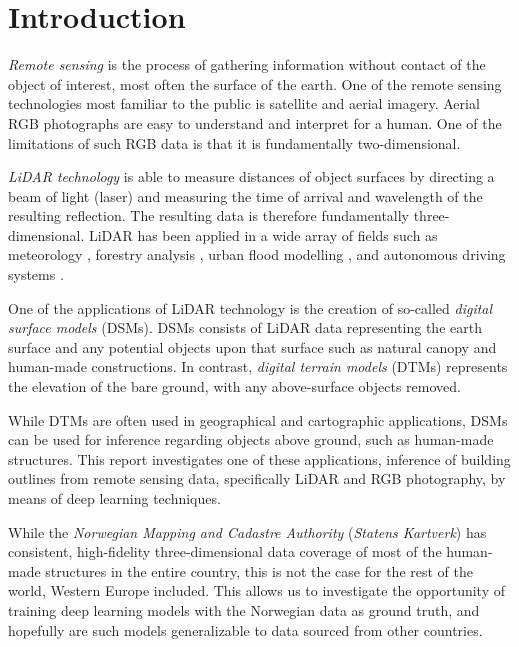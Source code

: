 \section*{Introduction}

\textit{Remote sensing} is the process of gathering information without contact of the object of interest, most often the surface of the earth.
One of the remote sensing technologies most familiar to the public is satellite and aerial imagery.
Aerial RGB photographs are easy to understand and interpret for a human.
One of the limitations of such RGB data is that it is fundamentally two-dimensional.

\textit{LiDAR technology} is able to measure distances of object surfaces by directing a beam of light (laser) and measuring the time of arrival and wavelength of the resulting reflection.
The resulting data is therefore fundamentally three-dimensional.
LiDAR has been applied in a wide array of fields such as meteorology \cite{lidar_meteorology_1966}, forestry analysis \cite{lidar_forestry_2000}, urban flood modelling \cite{lidar_flood_2013}, and autonomous driving systems \cite{lidar_self_driving_2018}.

One of the applications of LiDAR technology is the creation of so-called \textit{digital surface models} (DSMs).
DSMs consists of LiDAR data representing the earth surface and any potential objects upon that surface such as natural canopy and human-made constructions.
In contrast, \textit{digital terrain models} (DTMs) represents the elevation of the bare ground, with any above-surface objects removed.

While DTMs are often used in geographical and cartographic applications, DSMs can be used for inference regarding objects above ground, such as human-made structures.
This report investigates one of these applications, inference of building outlines from remote sensing data, specifically LiDAR and RGB photography, by means of deep learning techniques.

While the \textit{Norwegian Mapping and Cadastre Authority} (\textit{Statens Kartverk}) has consistent, high-fidelity three-dimensional data coverage of most of the human-made structures in the entire country, this is not the case for the rest of the world, Western Europe included.
This allows us to investigate the opportunity of training deep learning models with the Norwegian data as ground truth, and hopefully are such models generalizable to data sourced from other countries.

